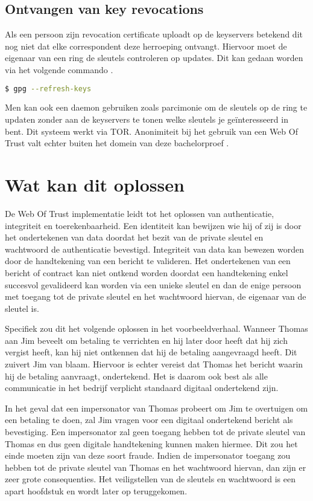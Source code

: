 \subsection{Ontvangen van key revocations}
\label{subsec:ontvangen-van-key-revocations}

Als een persoon zijn revocation certificate uploadt op de keyservers betekend
dit nog niet dat elke correspondent deze herroeping ontvangt. Hiervoor moet de
eigenaar van een ring de sleutels controleren op updates. Dit kan gedaan worden
via het volgende commando \autocite{GnuPGFAQ}.

\begin{lstlisting}[language=bash]
$ gpg --refresh-keys
\end{lstlisting}

Men kan ook een daemon gebruiken zoals parcimonie om de sleutels op de ring te
updaten zonder aan de keyservers te tonen welke sleutels je geïnteresseerd in
bent. Dit systeem werkt via TOR. Anonimiteit bij het gebruik van een Web Of
Trust valt echter buiten het domein van deze bachelorproef
\autocite{RiseUpOpenPGPBestPractices}.

\section{Wat kan dit oplossen}
\label{sec:wat-kan-dit-oplossen}

De Web Of Trust implementatie leidt tot het oplossen van authenticatie,
integriteit en toerekenbaarheid. Een identiteit kan bewijzen wie hij of zij is
door het ondertekenen van data doordat het bezit van de private sleutel en
wachtwoord de authenticatie bevestigd. Integriteit van data kan bewezen worden
door de handtekening van een bericht te valideren. Het ondertekenen van een
bericht of contract kan niet ontkend worden doordat een handtekening enkel
succesvol gevalideerd kan worden via een unieke sleutel en dan de enige persoon
met toegang tot de private sleutel en het wachtwoord hiervan, de eigenaar van de
sleutel is.

Specifiek zou dit het volgende oplossen in het voorbeeldverhaal. Wanneer Thomas
aan Jim beveelt om betaling te verrichten en hij later door heeft dat hij zich
vergist heeft, kan hij niet ontkennen dat hij de betaling aangevraagd heeft. Dit
zuivert Jim van blaam. Hiervoor is echter vereist dat Thomas het bericht waarin
hij de betaling aanvraagt, ondertekend. Het is daarom ook best als alle
communicatie in het bedrijf verplicht standaard digitaal ondertekend zijn.

In het geval dat een impersonator van Thomas probeert om Jim te overtuigen om
een betaling te doen, zal Jim vragen voor een digitaal ondertekend bericht als
bevestiging. Een impersonator zal geen toegang hebben tot de private sleutel van
Thomas en dus geen digitale handtekening kunnen maken hiermee. Dit zou het einde
moeten zijn van deze soort fraude. Indien de impersonator toegang zou hebben tot
de private sleutel van Thomas en het wachtwoord hiervan, dan zijn er zeer grote
consequenties. Het veiligstellen van de sleutels en wachtwoord is een apart
hoofdstuk en wordt later op teruggekomen.

